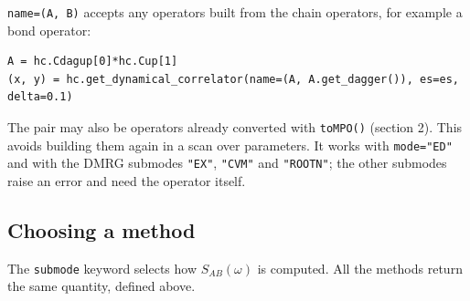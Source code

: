 \documentclass[11pt]{article}
\begin{document}
\texttt{name=(A,\ B)} accepts any operators built from the chain operators, for
example a bond operator:

\begin{lstlisting}
A = hc.Cdagup[0]*hc.Cup[1]
(x, y) = hc.get_dynamical_correlator(name=(A, A.get_dagger()), es=es, delta=0.1)
\end{lstlisting}

The pair may also be operators already converted with \texttt{toMPO()} (section
2). This avoids building them again in a scan over parameters. It works
with \texttt{mode="ED"} and with the DMRG submodes \texttt{"EX"}, \texttt{"CVM"} and \texttt{"ROOTN"};
the other submodes raise an error and need the operator itself.

\subsection{Choosing a method}

The \texttt{submode} keyword selects how \(S_{AB}(\omega)\) is computed. All the
methods return the same quantity, defined above.
\end{document}
